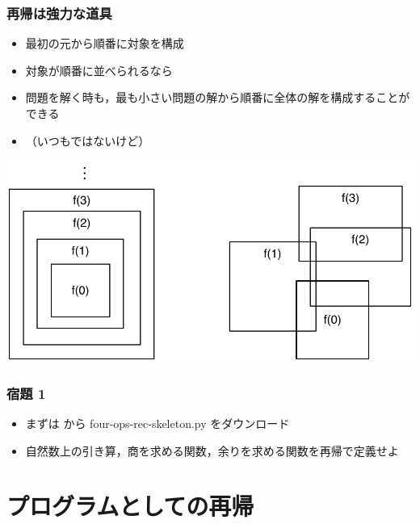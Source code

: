 \begin{frame}[fragile]
\frametitle{再帰は強力な道具}
  \begin{itemize}
\item 最初の元から順番に対象を構成
\item 対象が順番に並べられるなら
\item 問題を解く時も，最も小さい問題の解から順番に全体の解を構成することができる
\item （いつもではないけど）
  \end{itemize}
  \begin{center}
\includegraphics[scale=0.3]{./Figure/Structure.pdf}
  \end{center}
\end{frame}
\begin{frame}[fragile]
\frametitle{宿題 1}
  \begin{itemize}
\item まずは\href{https://sites.google.com/presystems.xyz/elementarycs/top}{} から four-ops-rec-skeleton.py をダウンロード
\item 自然数上の引き算，商を求める関数，余りを求める関数を再帰で定義せよ
  \end{itemize}
\end{frame}
\section{プログラムとしての再帰}
